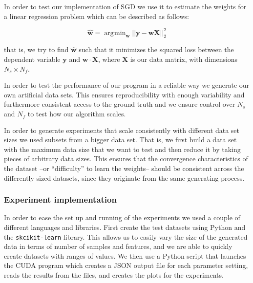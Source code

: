 \documentclass[11pt,a4paper]{article}
\DeclareMathOperator*{\argmin}{\arg\!\min}
\begin{document}
In order to test our implementation of SGD we use it to estimate the weights for a linear
regression problem which can be described as follows:

\begin{equation}
	\mathbf{\hat{w}} = \argmin_{\mathbf{w}} ||\mathbf{y} - \mathbf{w}  \mathbf{X} ||^2_2
\end{equation}

that is, we try to find $\mathbf{\hat{w}}$ such that it minimizes the squared loss between
the dependent variable $\mathbf{y}$ and $\mathbf{w} \cdot \mathbf{X}$, where $\mathbf{X}$ is
our data matrix, with dimensions $N_s \times N_f$.

In order to test the performance of our program in a reliable way we 
generate our own artificial data sets. This ensures reproducibility with enough
variability and furthermore consistent access to the ground truth and 
we ensure control over $N_s$ and $N_f$ to test how our algorithm scales. 

In order to generate experiments that scale consistently  with different
data set sizes we used subsets from a bigger data set. 
That is, we first build a data set with the maximum data size that we want to 
test and then reduce it by taking pieces of arbitrary data sizes. This ensures
that the convergence characteristics of the dataset --or ``difficulty'' to learn the weights--
should be consistent across the differently sized datasets, since they originate
from the same generating process.

%
%

\subsubsection*{Experiment implementation}

In order to ease the set up and running of the experiments we used a couple of different
languages and libraries. First create the test datasets using Python and the \texttt{skcikit-learn}
library. This allows us to easily vary the size of the generated data in terms of number
of samples and features, and we are able to quickly create datasets with ranges of values.
We then use a Python script that launches the CUDA program which creates a JSON output file for each parameter setting, 
reads the results from the files, and creates the plots for the experiments.
\end{document}
